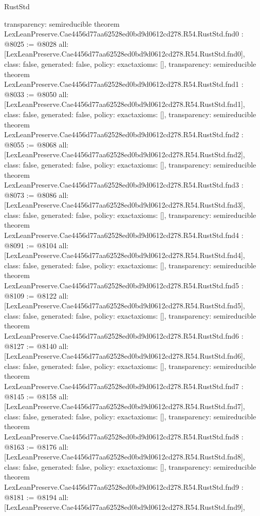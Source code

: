 \begin{lexlean}{RustStd}
\begin{coremodule}
{  transparency: semireducible
}
theorem LexLeanPreserve.Cae4456d77aa62528ed0bd9d0612cd278.R54.RustStd.fnd0 : @8025 := @8028 {
  all: [LexLeanPreserve.Cae4456d77aa62528ed0bd9d0612cd278.R54.RustStd.fnd0],
  class: false,
  generated: false,
  policy: exact{axioms: []},
  transparency: semireducible
}
theorem LexLeanPreserve.Cae4456d77aa62528ed0bd9d0612cd278.R54.RustStd.fnd1 : @8033 := @8050 {
  all: [LexLeanPreserve.Cae4456d77aa62528ed0bd9d0612cd278.R54.RustStd.fnd1],
  class: false,
  generated: false,
  policy: exact{axioms: []},
  transparency: semireducible
}
theorem LexLeanPreserve.Cae4456d77aa62528ed0bd9d0612cd278.R54.RustStd.fnd2 : @8055 := @8068 {
  all: [LexLeanPreserve.Cae4456d77aa62528ed0bd9d0612cd278.R54.RustStd.fnd2],
  class: false,
  generated: false,
  policy: exact{axioms: []},
  transparency: semireducible
}
theorem LexLeanPreserve.Cae4456d77aa62528ed0bd9d0612cd278.R54.RustStd.fnd3 : @8073 := @8086 {
  all: [LexLeanPreserve.Cae4456d77aa62528ed0bd9d0612cd278.R54.RustStd.fnd3],
  class: false,
  generated: false,
  policy: exact{axioms: []},
  transparency: semireducible
}
theorem LexLeanPreserve.Cae4456d77aa62528ed0bd9d0612cd278.R54.RustStd.fnd4 : @8091 := @8104 {
  all: [LexLeanPreserve.Cae4456d77aa62528ed0bd9d0612cd278.R54.RustStd.fnd4],
  class: false,
  generated: false,
  policy: exact{axioms: []},
  transparency: semireducible
}
theorem LexLeanPreserve.Cae4456d77aa62528ed0bd9d0612cd278.R54.RustStd.fnd5 : @8109 := @8122 {
  all: [LexLeanPreserve.Cae4456d77aa62528ed0bd9d0612cd278.R54.RustStd.fnd5],
  class: false,
  generated: false,
  policy: exact{axioms: []},
  transparency: semireducible
}
theorem LexLeanPreserve.Cae4456d77aa62528ed0bd9d0612cd278.R54.RustStd.fnd6 : @8127 := @8140 {
  all: [LexLeanPreserve.Cae4456d77aa62528ed0bd9d0612cd278.R54.RustStd.fnd6],
  class: false,
  generated: false,
  policy: exact{axioms: []},
  transparency: semireducible
}
theorem LexLeanPreserve.Cae4456d77aa62528ed0bd9d0612cd278.R54.RustStd.fnd7 : @8145 := @8158 {
  all: [LexLeanPreserve.Cae4456d77aa62528ed0bd9d0612cd278.R54.RustStd.fnd7],
  class: false,
  generated: false,
  policy: exact{axioms: []},
  transparency: semireducible
}
theorem LexLeanPreserve.Cae4456d77aa62528ed0bd9d0612cd278.R54.RustStd.fnd8 : @8163 := @8176 {
  all: [LexLeanPreserve.Cae4456d77aa62528ed0bd9d0612cd278.R54.RustStd.fnd8],
  class: false,
  generated: false,
  policy: exact{axioms: []},
  transparency: semireducible
}
theorem LexLeanPreserve.Cae4456d77aa62528ed0bd9d0612cd278.R54.RustStd.fnd9 : @8181 := @8194 {
  all: [LexLeanPreserve.Cae4456d77aa62528ed0bd9d0612cd278.R54.RustStd.fnd9],
}
\end{coremodule}
\end{lexlean}
